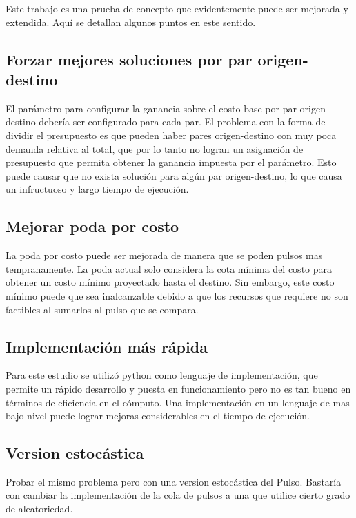 \documentclass{article}
\begin{document}
  Este trabajo es una prueba de concepto que evidentemente puede ser mejorada y extendida. Aquí se detallan algunos puntos en este sentido.

  \subsection*{Forzar mejores soluciones por par origen-destino}

  El parámetro para configurar la ganancia sobre el costo base por par origen-destino debería ser configurado para cada par. El problema con la forma de dividir el presupuesto es que pueden haber pares origen-destino con muy poca demanda relativa al total, que por lo tanto no logran un asignación de presupuesto que permita obtener la ganancia impuesta por el parámetro. Esto puede causar que no exista solución para algún par origen-destino, lo que causa un infructuoso y largo tiempo de ejecución.

  \subsection*{Mejorar poda por costo}

  La poda por costo puede ser mejorada de manera que se poden pulsos mas tempranamente. La poda actual solo considera la cota mínima del costo para obtener un costo mínimo proyectado hasta el destino. Sin embargo, este costo mínimo puede que sea inalcanzable debido a que los recursos que requiere no son factibles al sumarlos al pulso que se compara.

  \subsection*{Implementación más rápida}

  Para este estudio se utilizó python como lenguaje de implementación, que permite un rápido desarrollo y puesta en funcionamiento pero no es tan bueno en términos de eficiencia en el cómputo. Una implementación en un lenguaje de mas bajo nivel puede lograr mejoras considerables en el tiempo de ejecución.

  \subsection*{Version estocástica}

  Probar el mismo problema pero con una version estocástica del Pulso. Bastaría con cambiar la implementación de la cola de pulsos a una que utilice cierto grado de aleatoriedad.
\end{document}
